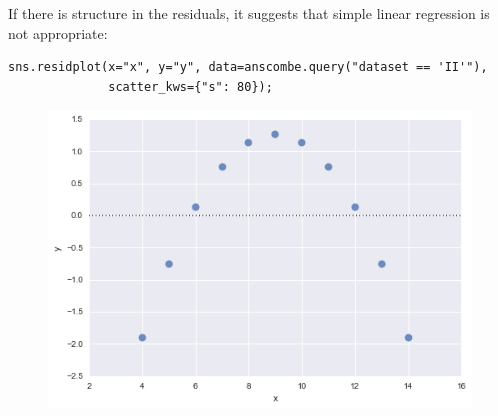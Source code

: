 \documentclass{beamer}
\begin{document}
\begin{frame}[fragile]
	\large
If there is structure in the residuals, it suggests that simple linear regression is not appropriate:
\begin{verbatim}
sns.residplot(x="x", y="y", data=anscombe.query("dataset == 'II'"),
              scatter_kws={"s": 80});
\end{verbatim}
\begin{figure}
\centering
\includegraphics[width=0.7\linewidth]{images/regression_37_0}
\end{figure}

\end{frame}
\end{document}
